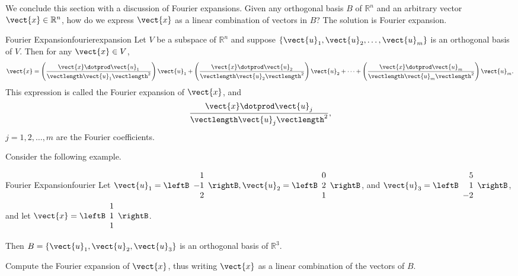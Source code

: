 We conclude this section with a discussion of Fourier expansions. Given any orthogonal basis $B$ of $\mathbb{R}^n$ and an arbitrary vector $\vect{x} \in \mathbb{R}^n$, how do we express $\vect{x}$ as a linear combination of vectors in $B$? The solution is Fourier expansion. 

\begin{theorem}{Fourier Expansion}{fourierexpansion}
Let $V$ be a subspace of $\mathbb{R}^n$ and suppose $\{ \vect{u}_1, \vect{u}_2, \ldots, \vect{u}_m \}$
is an orthogonal basis of $V$. 
Then for any $\vect{x}\in V$,
\[ \vect{x} = 
\left(\frac{\vect{x}\dotprod \vect{u}_1}{\vectlength \vect{u}_1 \vectlength^2}\right) \vect{u}_1 +
\left(\frac{\vect{x}\dotprod \vect{u}_2}{\vectlength \vect{u}_2 \vectlength^2}\right) \vect{u}_2 +
\cdots +
\left(\frac{\vect{x}\dotprod \vect{u}_m}{\vectlength \vect{u}_m \vectlength^2}\right) \vect{u}_m.
\]
This expression is called the Fourier expansion 
of $\vect{x}$, and 
\[ \frac{\vect{x}\dotprod \vect{u}_j}{\vectlength \vect{u}_j \vectlength^2},\]
$j=1,2,\ldots,m$
are the Fourier coefficients.
\end{theorem}

Consider the following example.

\begin{example}{Fourier Expansion}{fourier}
Let
$\vect{u}_1= \leftB\begin{array}{r} 1 \\ -1 \\ 2 \end{array}\rightB,
\vect{u}_2= \leftB\begin{array}{r} 0 \\ 2 \\ 1  \end{array}\rightB$,
and
$\vect{u}_3 =\leftB\begin{array}{r} 5 \\ 1 \\ -2 \end{array}\rightB$, 
and let 
$\vect{x} =\leftB\begin{array}{r} 1 \\ 1 \\ 1 \end{array}\rightB$.

Then $B=\{ \vect{u}_1, \vect{u}_2, \vect{u}_3\}$
is an orthogonal basis of $\mathbb{R}^3$. 

Compute the Fourier expansion of $\vect{x}$, thus writing $\vect{x}$ as  a linear combination of the vectors of $B$. 
\end{example}

